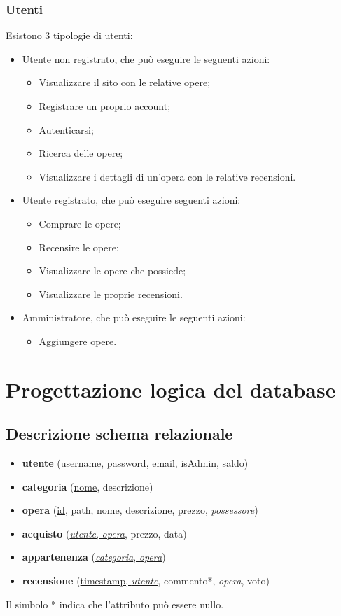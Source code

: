 \documentclass[10pt]{article}
\begin{document}
\subsubsection{Utenti}
Esistono 3 tipologie di utenti:
\begin{itemize}
    \item Utente non registrato, che può eseguire le seguenti azioni:
    \begin{itemize}
        \item Visualizzare il sito con le relative opere;
        \item Registrare un proprio account;
        \item Autenticarsi;
        \item Ricerca delle opere;
        \item Visualizzare i dettagli di un'opera con le relative recensioni.
    \end{itemize}
    \item Utente registrato, che può eseguire seguenti azioni:
    \begin{itemize}
        \item Comprare le opere;
        \item Recensire le opere;
        \item Visualizzare le opere che possiede;
        \item Visualizzare le proprie recensioni.
    \end{itemize}
    \item Amministratore, che può eseguire le seguenti azioni:
    \begin{itemize}
        \item Aggiungere opere.
    \end{itemize}
\end{itemize}

\section{Progettazione logica del database}

\subsection{Descrizione schema relazionale}
\begin{itemize}
    \item \textbf{utente} (\underline{username}, password, email, isAdmin, saldo)
    \item \textbf{categoria} (\underline{nome}, descrizione)
    \item \textbf{opera} (\underline{id}, path, nome, descrizione, prezzo, \textit{possessore})
    \item \textbf{acquisto} (\underline{\textit{utente}, \textit{opera}}, prezzo, data)
    \item \textbf{appartenenza} (\underline{\textit{categoria}, \textit{opera}})
    \item \textbf{recensione} (\underline{timestamp, \textit{utente}}, commento*, \textit{opera}, voto)
\end{itemize}
Il simbolo * indica che l'attributo può essere nullo.
\end{document}
